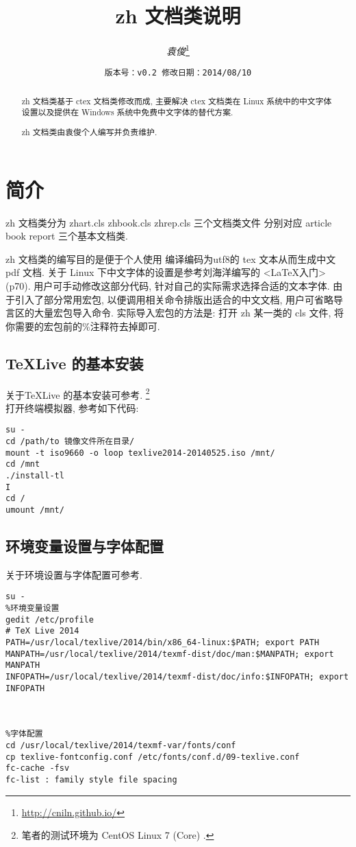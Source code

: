 \documentclass{zhart}
\title{\textbf{zh 文档类说明}}
\author{\textit{袁俊}\thanks{\url{http://cniln.github.io/}}}
\date{\small{\texttt{版本号：v0.2 \qquad 修改日期：2014/08/10}}}
\begin{document}
\maketitle
\begin{abstract}
zh 文档类基于 ctex 文档类修改而成, 主要解决 ctex 文档类在 Linux 系统中的中文字体设置以及提供在 Windows 系统中免费中文字体的替代方案.

zh 文档类由袁俊个人编写并负责维护.
\end{abstract}
\newpage
\tableofcontents
\section{简介}

zh 文档类分为 zhart.cls zhbook.cls zhrep.cls 三个文档类文件 分别对应 article book report 三个基本文档类. 

zh 文档类的编写目的是便于个人使用 \XeLaTeX 编译编码为utf\/8的 tex 文本从而生成中文 pdf 文档. 关于 Linux 下中文字体的设置是参考刘海洋编写的 <\LaTeX 入门> (p70). 用户可手动修改这部分代码, 针对自己的实际需求选择合适的文本字体. 由于引入了部分常用宏包, 以便调用相关命令排版出适合的中文文档, 用户可省略导言区的大量宏包导入命令. 实际导入宏包的方法是: 打开 zh 某一类的 cls 文件, 将你需要的宏包前的\%注释符去掉即可. 

\subsection{\TeX Live 的基本安装}
关于\TeX Live 的基本安装可参考\cite{TeXLive2014}. \footnote{笔者的测试环境为 CentOS Linux 7 (Core) . } \\
打开终端模拟器, 参考如下代码: 

\begin{verbatim}
su -
cd /path/to 镜像文件所在目录/
mount -t iso9660 -o loop texlive2014-20140525.iso /mnt/
cd /mnt
./install-tl
I
cd /
umount /mnt/
\end{verbatim}

\subsection{环境变量设置与字体配置}
关于环境设置与字体配置可参考\cite{TeXLive2014}. 
\begin{verbatim}
su -
%环境变量设置
gedit /etc/profile
# TeX Live 2014
PATH=/usr/local/texlive/2014/bin/x86_64-linux:$PATH; export PATH
MANPATH=/usr/local/texlive/2014/texmf-dist/doc/man:$MANPATH; export MANPATH
INFOPATH=/usr/local/texlive/2014/texmf-dist/doc/info:$INFOPATH; export INFOPATH



%字体配置
cd /usr/local/texlive/2014/texmf-var/fonts/conf
cp texlive-fontconfig.conf /etc/fonts/conf.d/09-texlive.conf
fc-cache -fsv
fc-list : family style file spacing
\end{verbatim}
\end{document}
